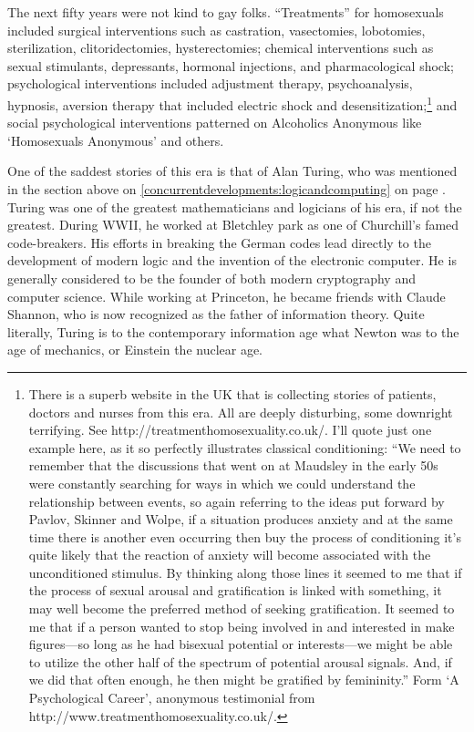 \begin{refsection}
The next fifty years were not kind to gay folks. “Treatments” for homosexuals included surgical interventions such as castration, vasectomies, lobotomies, sterilization, clitoridectomies, hysterectomies; chemical interventions such as sexual stimulants, depressants, hormonal injections, and pharmacological shock; psychological interventions included adjustment therapy, psychoanalysis, hypnosis, aversion therapy that included electric shock and desensitization;\footnote{There is a superb website in the UK that is collecting stories of patients, doctors and nurses from this era. All are deeply disturbing, some downright terrifying. See http:\slash \slash treatmenthomosexuality.co.uk\slash . I'll quote just one example here, as it so perfectly illustrates classical conditioning:
“We need to remember that the discussions that went on at Maudsley in the early 50s were constantly searching for ways in which we could understand the relationship between events, so again referring to the ideas put forward by Pavlov, Skinner and Wolpe, if a situation produces anxiety and at the same time there is another even occurring then buy the process of conditioning it's quite likely that the reaction of anxiety will become associated with the unconditioned stimulus. By thinking along those lines it seemed to me that if the process of sexual arousal and gratification is linked with something, it may well become the preferred method of seeking gratification. It seemed to me that if a person wanted to stop being involved in and interested in make figures—so long as he had bisexual potential or interests—we might be able to utilize the other half of the spectrum of potential arousal signals. And, if we did that often enough, he then might be gratified by femininity.”
Form `A Psychological Career', anonymous testimonial from http:\slash \slash www.treatmenthomosexuality.co.uk\slash .} and social psychological interventions patterned on Alcoholics Anonymous like `Homosexuals Anonymous' and others.

One of the saddest stories of this era is that of Alan Turing, who was mentioned in the section above on \ref{concurrentdevelopments:logicandcomputing} on page \pageref{concurrentdevelopments:logicandcomputing}. Turing was one of the greatest mathematicians and logicians of his era, if not the greatest. During WWII, he worked at Bletchley park as one of Churchill's famed code-breakers. His efforts in breaking the German codes lead directly to the development of modern logic and the invention of the electronic computer. He is generally considered to be the founder of both modern cryptography and computer science. While working at Princeton, he became friends with Claude Shannon, who is now recognized as the father of information theory. Quite literally, Turing is to the contemporary information age what Newton was to the age of mechanics, or Einstein the nuclear age.


\end{refsection}
